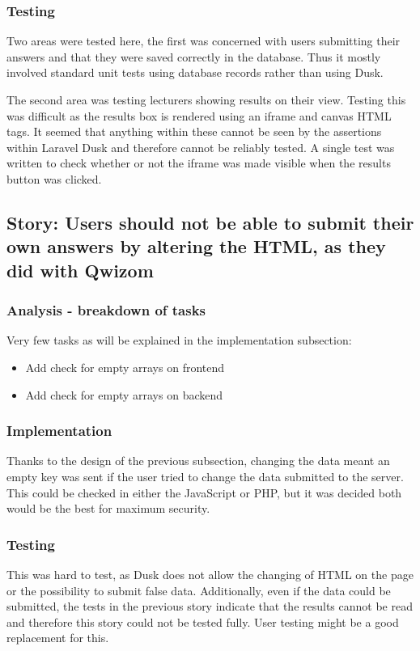 \subsubsection{Testing}
Two areas were tested here, the first was concerned with users submitting their answers and that they were saved correctly in the database. Thus it mostly involved standard unit tests using database records rather than using Dusk. 

The second area was testing lecturers showing results on their view. Testing this was difficult as the results box is rendered using an iframe and canvas HTML tags. It seemed that anything within these cannot be seen by the assertions within Laravel Dusk and therefore cannot be reliably tested. A single test was written to check whether or not the iframe was made visible when the results button was clicked.
\newpage

\subsection{Story: Users should not be able to submit their own answers by altering the HTML, as they did with Qwizom}
\subsubsection{Analysis - breakdown of tasks}
Very few tasks as will be explained in the implementation subsection:
\begin{itemize}
	\item Add check for empty arrays on frontend
	\item Add check for empty arrays on backend
\end{itemize}
\subsubsection{Implementation}
Thanks to the design of the previous subsection, changing the data meant an empty key was sent if the user tried to change the data submitted to the server. This could be checked in either the JavaScript or PHP, but it was decided both would be the best for maximum security. 
\subsubsection{Testing}
This was hard to test, as Dusk does not allow the changing of HTML on the page or the possibility to submit false data. Additionally, even if the data could be submitted, the tests in the previous story indicate that the results cannot be read and therefore this story could not be tested fully. User testing might be a good replacement for this.
\newpage


